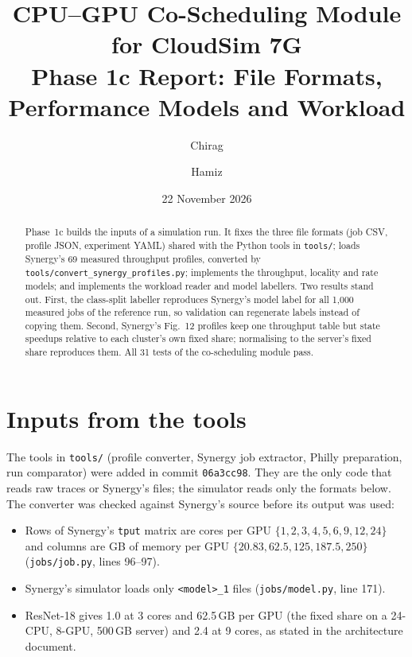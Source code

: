 \documentclass[11pt,a4paper]{article}
\title{CPU--GPU Co-Scheduling Module for CloudSim 7G\\[4pt]
\large Phase 1c Report: File Formats, Performance Models and Workload}
\author{Chirag \and Hamiz}
\date{22 November 2026}
\newcommand{\code}[1]{\texttt{#1}}
\begin{document}
\maketitle

\begin{abstract}
Phase~1c builds the inputs of a simulation run. It fixes the three file formats (job CSV, profile
JSON, experiment YAML) shared with the Python tools in \code{tools/}; loads Synergy's 69 measured
throughput profiles, converted by \code{tools/convert\_synergy\_profiles.py}; implements the throughput,
locality and rate models; and implements the workload reader and model labellers. Two results stand
out. First, the class-split labeller reproduces Synergy's model label for all 1,000 measured jobs of
the reference run, so validation can regenerate labels instead of copying them. Second, Synergy's
Fig.~12 profiles keep one throughput table but state speedups relative to each cluster's own fixed
share; normalising to the server's fixed share reproduces them. All 31 tests of the co-scheduling
module pass.
\end{abstract}

\tableofcontents

\section{Inputs from the tools}

The tools in \code{tools/} (profile converter, Synergy job extractor, Philly preparation, run
comparator) were added in commit \code{06a3cc98}. They are the only code that reads raw traces or
Synergy's files; the simulator reads only the formats below. The converter was checked against
Synergy's source before its output was used:

\begin{itemize}
  \item Rows of Synergy's \code{tput} matrix are cores per GPU $\{1,2,3,4,5,6,9,12,24\}$ and columns
        are GB of memory per GPU $\{20.83, 62.5, 125, 187.5, 250\}$ (\code{jobs/job.py}, lines 96--97).
  \item Synergy's simulator loads only \code{<model>\_1} files (\code{jobs/model.py}, line 171).
  \item ResNet-18 gives 1.0 at 3 cores and 62.5\,GB per GPU (the fixed share on a 24-CPU, 8-GPU,
        500\,GB server) and 2.4 at 9 cores, as stated in the architecture document.
\end{itemize}
\end{document}

